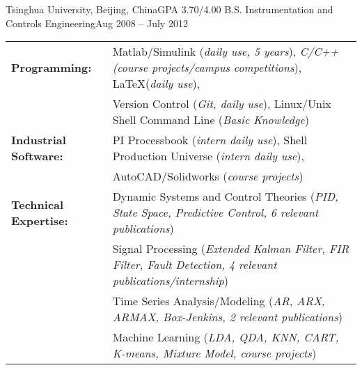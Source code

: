 \documentclass[10pt,a4paper]{article}
\begin{document}
\headedsection
{Tsinghua University, Beijing, China}{GPA 3.70/4.00}{
	\headedsubsection
  {B.S. Instrumentation and Controls Engineering}{Aug 2008 -- July 2012}{}
}

\spacedhrule{0.5em}{-0.8em}
\small{
\begin{tabular}{ll}
  
  {\normalsize{\textbf{Programming: }}} & Matlab/Simulink (\textit{daily use, 5 years}), \textit{C/C++ (course projects/campus competitions}), \LaTeX (\textit{daily use}),\\
                                        & Version Control (\textit{Git, daily use}), Linux/Unix Shell Command Line (\textit{Basic Knowledge})\\
  
  {\normalsize \textbf{Industrial Software: }} & PI Processbook (\textit{intern daily use}),
                                                 Shell Production Universe (\textit{intern daily use}),\\
                                        & AutoCAD/Solidworks (\textit{course projects})\\
  {\normalsize{\textbf{Technical Expertise: }}} & Dynamic Systems and Control Theories (\textit{PID, State Space, Predictive Control, 6 relevant publications})\\
                                        & Signal Processing (\textit{Extended Kalman Filter, FIR Filter, Fault Detection, 4 relevant publications/internship})\\
                                        & Time Series Analysis/Modeling (\textit{AR, ARX, ARMAX, Box-Jenkins, 2 relevant publications})\\
                                        & Machine Learning (\textit{LDA, QDA, KNN, CART, K-means, Mixture Model, course projects})
\end{tabular}
}



\end{document}
